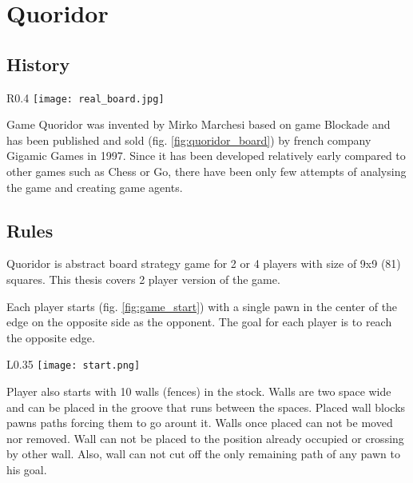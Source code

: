\chapter{Quoridor}\label{chap:3}

\section{History}
\begin{wrapfigure}{R}{0.4\textwidth}
  \vspace*{-1.80cm}
  \centering
  \texttt{[image: real\_board.jpg]}
  \vspace*{-0.20cm}
  \caption{real board}
  \label{fig:quoridor_board}
  \vspace*{-1.40cm}
\end{wrapfigure}

Game Quoridor was invented by Mirko Marchesi based on game Blockade and
has been published and sold (fig. \ref{fig:quoridor_board}) by french company
Gigamic Games in 1997. Since it has been developed relatively early compared
to other games such as Chess or Go, there have been only few attempts
of analysing the game and creating game agents.

\section{Rules}
Quoridor is abstract board strategy game for 2 or 4 players with size of
9x9 (81) squares. This thesis covers 2 player version of the game.

Each player starts (fig. \ref{fig:game_start}) with a single pawn in the center
of the edge on the opposite side as the opponent.
The goal for each player is to reach the opposite edge.

\begin{wrapfigure}{L}{0.35\textwidth}
  \vspace*{-0.60cm}
  \centering
  \texttt{[image: start.png]}
  \vspace*{-0.80cm}
  \caption{game start}
  \label{fig:game_start}
  \vspace*{-0.80cm}
\end{wrapfigure}

Player also starts with 10 walls (fences) in the stock.
Walls are two space wide and can be placed in the groove that runs between
the spaces.
Placed wall blocks pawns paths forcing them to go arount it.
Walls once placed can not be moved nor removed.
Wall can not be placed to the position already occupied or crossing by
other wall.
Also, wall can not cut off the only remaining path of any pawn to his goal.

